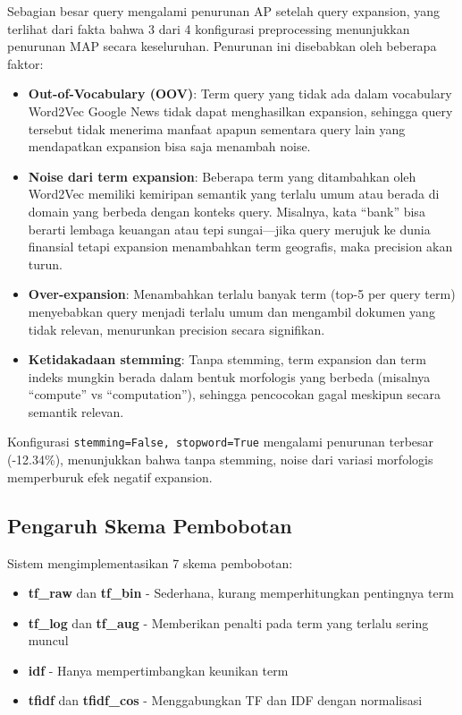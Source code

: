 \documentclass[12pt,a4paper]{report}
\begin{document}
Sebagian besar query mengalami penurunan AP setelah query expansion, yang terlihat dari fakta bahwa 3 dari 4 konfigurasi preprocessing menunjukkan penurunan MAP secara keseluruhan. Penurunan ini disebabkan oleh beberapa faktor:
\begin{itemize}
    \item \textbf{Out-of-Vocabulary (OOV)}: Term query yang tidak ada dalam vocabulary Word2Vec Google News tidak dapat menghasilkan expansion, sehingga query tersebut tidak menerima manfaat apapun sementara query lain yang mendapatkan expansion bisa saja menambah noise.
    \item \textbf{Noise dari term expansion}: Beberapa term yang ditambahkan oleh Word2Vec memiliki kemiripan semantik yang terlalu umum atau berada di domain yang berbeda dengan konteks query. Misalnya, kata ``bank'' bisa berarti lembaga keuangan atau tepi sungai---jika query merujuk ke dunia finansial tetapi expansion menambahkan term geografis, maka precision akan turun.
    \item \textbf{Over-expansion}: Menambahkan terlalu banyak term (top-5 per query term) menyebabkan query menjadi terlalu umum dan mengambil dokumen yang tidak relevan, menurunkan precision secara signifikan.
    \item \textbf{Ketidakadaan stemming}: Tanpa stemming, term expansion dan term indeks mungkin berada dalam bentuk morfologis yang berbeda (misalnya ``compute'' vs ``computation''), sehingga pencocokan gagal meskipun secara semantik relevan.
\end{itemize}
Konfigurasi \texttt{stemming=False, stopword=True} mengalami penurunan terbesar (-12.34\%), menunjukkan bahwa tanpa stemming, noise dari variasi morfologis memperburuk efek negatif expansion.

\subsection{Pengaruh Skema Pembobotan}
Sistem mengimplementasikan 7 skema pembobotan:
\begin{itemize}
    \item \textbf{tf\_raw} dan \textbf{tf\_bin} - Sederhana, kurang memperhitungkan pentingnya term
    \item \textbf{tf\_log} dan \textbf{tf\_aug} - Memberikan penalti pada term yang terlalu sering muncul
    \item \textbf{idf} - Hanya mempertimbangkan keunikan term
    \item \textbf{tfidf} dan \textbf{tfidf\_cos} - Menggabungkan TF dan IDF dengan normalisasi
\end{itemize}
\end{document}

